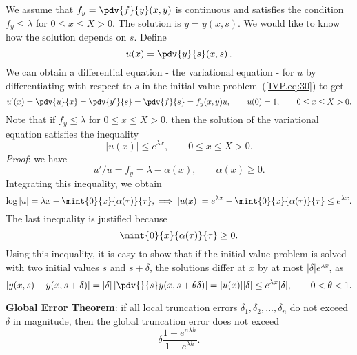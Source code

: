 We assume that $f_y=\pdv{f}{y}(x,y)$ is continuous
and satisfies the condition $f_y\le \lambda$ for $0\le x\le X>0$. The
solution is $y=y(x,s)$. We would like to know how the solution depends
on $s$. Define
%
\begin{equation}
  u(x)=\pdv{y}{s}(x,s) \, .
 \label{IVP.eq:58}
\end{equation}
%
We can obtain a differential equation - the variational equation - for
$u$ by differentiating with respect to $s$ in the initial value
problem~(\ref{IVP.eq:30}) to get
%
\begin{equation}
  u'(x) = \pdv{u}{x} = \pdv{y'}{s} = \pdv{f}{s} = f_y(x,y) u, \qquad u(0)=1, \qquad 0 \le x \le X > 0.
  \label{IVP.eq:31}
\end{equation}
%
Note that if $f_y \le \lambda$ for $0 \le x \le X > 0$, then the solution
of the variational equation satisfies the inequality
%
\begin{equation}
  |u(x)| \le e^{\lambda x}, \qquad 0\le x\le X>0.
  \label{IVP.eq:33}
\end{equation}
%
{\it Proof}: we have
%
\begin{equation}
  u' / u = f_y = \lambda-\alpha(x), \qquad \alpha(x)\ge 0.
  \label{IVP.eq:32}
\end{equation}
%
Integrating this inequality, we obtain
%
\begin{equation}
  \log|u| = \lambda x - \mint{0}{x}{\alpha(\tau)}{\tau}, \implies
  |u(x)| = e^{\lambda x} - \mint{0}{x}{\alpha(\tau)}{\tau} \le e^{\lambda x}.
  \label{IVP.eq:34}
\end{equation}
%
The last inequality is justified because
%
\begin{equation}
  \mint{0}{x}{\alpha(\tau)}{\tau} \ge 0.
  \label{IVP.eq:35}
\end{equation}
%
Using this inequality, it is easy to show that if the initial value
problem is solved with two initial values $s$ and $s+\delta $, the
solutions differ at $x$ by at most $|\delta|e^{\lambda x}$, as
%
\begin{equation}
  |y(x,s) - y(x,s+\delta )| = |\delta|
  \left | \pdv{}{s} y(x,s+\theta\delta) \right| =
  |u(x)| |\delta| \le e^{\lambda x}|\delta|, \qquad 0<\theta<1.
 \label{IVP.eq:36}
\end{equation}

\noindent \textbf{Global Error Theorem}: if all local truncation
errors $\delta_1,\delta_2,...,\delta_n$ do not exceed $\delta$ in
magnitude, then the global truncation error does not exceed
%
\begin{equation}
 \delta \frac{1-e^{n\lambda h}}{1-e^{\lambda h}}  .
 \label{IVP.eq:37}
\end{equation}

